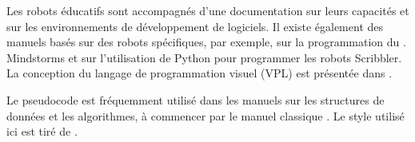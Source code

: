 Les robots éducatifs sont accompagnés d'une documentation sur leurs capacités et sur les environnements de développement de logiciels. Il existe également des manuels basés sur des robots spécifiques, par exemple, \cite{trobaugh} sur la programmation du \lego{}. Mindstorms et \cite{kumar} sur l'utilisation de Python pour programmer les robots Scribbler. La conception du langage de programmation visuel (VPL) est présentée dans \cite{shin2014idc}.

Le pseudocode est fréquemment utilisé dans les manuels sur les structures de données et les algorithmes, à commencer par le manuel classique \cite{aho}. Le style utilisé ici est tiré de \cite{pcdp2}.
